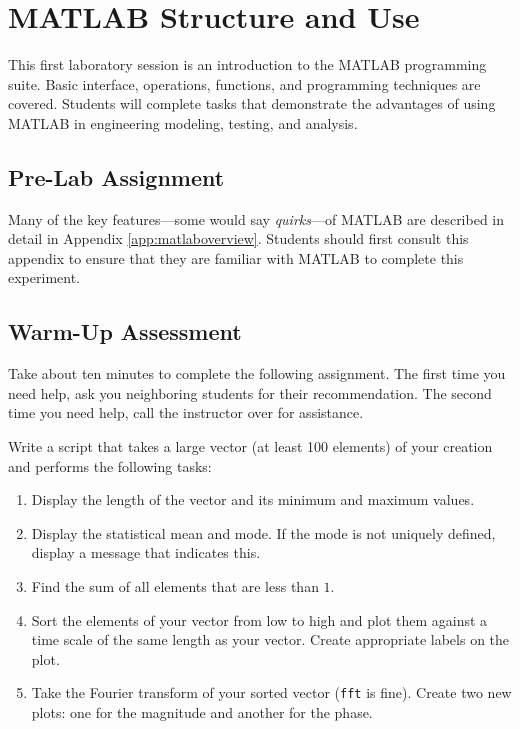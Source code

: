 

\chapter{MATLAB Structure and Use} \label{ch.Matlab}

This first laboratory session is an introduction to the MATLAB programming suite.  Basic interface, operations, functions, and programming techniques are covered.  Students will complete tasks that demonstrate the advantages of using MATLAB in engineering modeling, testing, and analysis.

\section{Pre-Lab Assignment}
Many of the key features---some would say \textit{quirks}---of MATLAB are described in detail in Appendix \ref{app:matlaboverview}.  Students should first consult this appendix to ensure that they are familiar with MATLAB to complete this experiment.

\section{Warm-Up Assessment}
Take about ten minutes to complete the following assignment.  The first time you need help, ask you neighboring students for their recommendation.  The second time you need help, call the instructor over for assistance.
\par
Write a script that takes a large vector (at least 100 elements) of your creation and performs the following tasks:
\begin{enumerate}
\item Display the length of the vector and its minimum and maximum values.
\item Display the statistical mean and mode.  If the mode is not uniquely defined, display a message that indicates this.
\item Find the sum of all elements that are less than $1$.
\item Sort the elements of your vector from low to high and plot them against a time scale of the same length as your vector.  Create appropriate labels on the plot.
\item Take the Fourier transform of your sorted vector (\verb=fft= is fine).  Create two new plots: one for the magnitude and another for the phase.
\end{enumerate}

